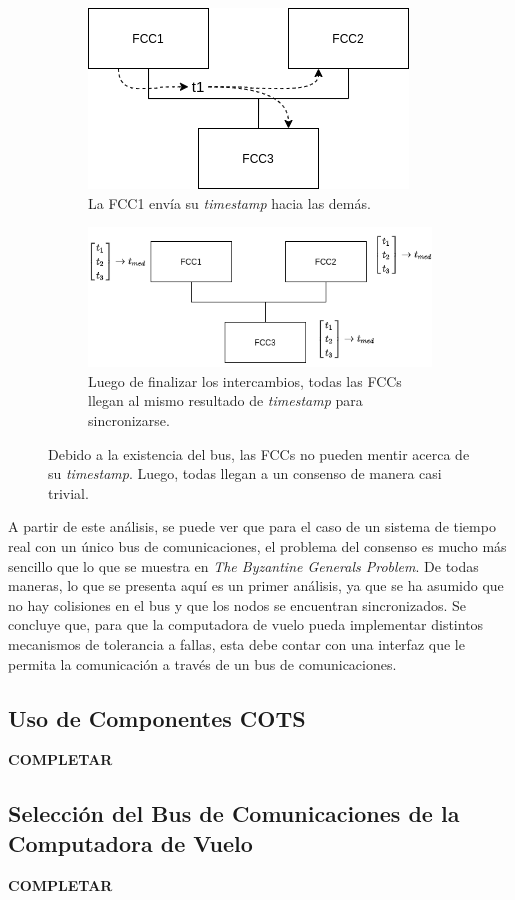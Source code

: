 \begin{figure}[H]
    \centering
    \begin{subfigure}[b]{0.34\textwidth}
        \includegraphics[width=\textwidth]{img/byzantine_bus_2.png}
        \caption{La FCC1 envía su \textit{timestamp} hacia las demás.}
        \label{fig:byzantine_bus_2}
    \end{subfigure}\hfill
    \begin{subfigure}[b]{0.49\textwidth}
        \includegraphics[width=\textwidth]{img/byzantine_bus_3.png}
        \caption{Luego de finalizar los intercambios, todas las FCCs llegan al mismo resultado de \textit{timestamp} para sincronizarse.}
        \label{fig:byzantine_bus_3}
    \end{subfigure}
    \caption{Debido a la existencia del bus, las FCCs no pueden mentir acerca de su \textit{timestamp}. Luego, todas llegan a un consenso de manera casi trivial.}
    \label{}
\end{figure}

A partir de este análisis, se puede ver que para el caso de un sistema de tiempo real con un único bus de comunicaciones, el problema del consenso es mucho más sencillo que lo que se muestra en \textit{The Byzantine Generals Problem}. De todas maneras, lo que se presenta aquí es un primer análisis, ya que se ha asumido que no hay colisiones en el bus y que los nodos se encuentran sincronizados. Se concluye que, para que la computadora de vuelo pueda implementar distintos mecanismos de tolerancia a fallas, esta debe contar con una interfaz que le permita la comunicación a través de un bus de comunicaciones.\\

\subsection{Uso de Componentes COTS}

\textbf{{\color{red} COMPLETAR}}

\subsection{Selección del Bus de Comunicaciones de la Computadora de Vuelo}

\textbf{{\color{red} COMPLETAR}}